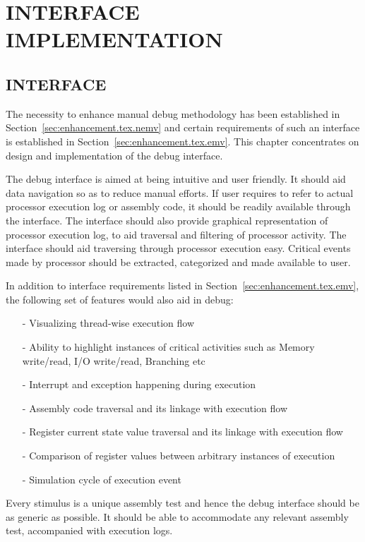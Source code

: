 \chapter{INTERFACE IMPLEMENTATION}
\label{chap:GUI_impl.tex}
\section{INTERFACE}
The necessity to enhance manual debug methodology has been established in Section~\ref{sec:enhancement.tex.nemv} and certain requirements of such an interface is established in Section~\ref{sec:enhancement.tex.emv}. This chapter concentrates on design and implementation of the debug interface.

The debug interface is aimed at being intuitive and user friendly. It should aid data navigation so as to reduce manual efforts. If user requires to refer to actual processor execution log or assembly code, it should be readily available through the interface. The interface should also provide graphical representation of processor execution log, to aid traversal and filtering of processor activity. The interface should aid traversing through processor execution easy.  Critical events made by processor should be extracted, categorized and made available to user.

In addition to interface requirements listed in Section~\ref{sec:enhancement.tex.emv}, the following set of features would also aid in debug:

\begin{itemize}
\item[-] Visualizing thread-wise execution flow
\item[-] Ability to highlight instances of critical activities such as Memory write/read, I/O write/read, Branching etc
\item[-] Interrupt and exception happening during execution
\item[-] Assembly code traversal and its linkage with execution flow
\item[-] Register current state value traversal and its linkage with execution flow
\item[-] Comparison of register values between arbitrary instances of execution
\item[-] Simulation cycle of execution event
\end{itemize}

Every stimulus is a unique assembly test and hence the debug interface should be as generic as possible. It should be able to accommodate any relevant assembly test, accompanied with execution logs.

